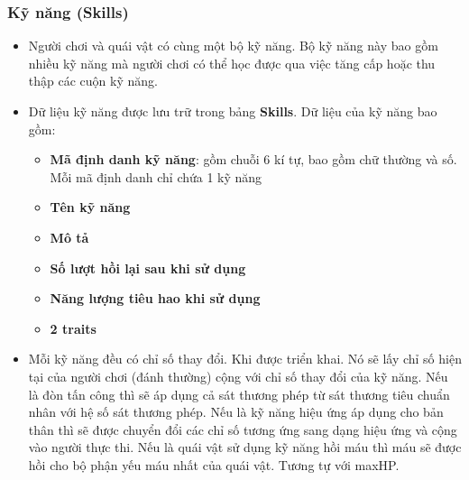 \subsubsection{Kỹ năng (Skills)}
\begin{itemize}
	\item Người chơi và quái vật có cùng một bộ kỹ năng. Bộ kỹ năng này bao gồm nhiều kỹ năng mà người chơi có thể học được qua việc tăng cấp hoặc thu thập các cuộn kỹ năng. 
	\item Dữ liệu kỹ năng được lưu trữ trong bảng \textbf{Skills}. Dữ liệu của kỹ năng bao gồm:
	\begin{itemize}
		\item \textbf{Mã định danh kỹ năng}: gồm chuỗi 6 kí tự, bao gồm chữ thường và số. Mỗi mã định danh chỉ chứa 1 kỹ năng
		\item \textbf{Tên kỹ năng}
		\item \textbf{Mô tả}
		\item \textbf{Số lượt hồi lại sau khi sử dụng}
		\item \textbf{Năng lượng tiêu hao khi sử dụng}
		\item \textbf{2 traits}
	\end{itemize}
	\item Mỗi kỹ năng đều có chỉ số thay đổi. Khi được triển khai. Nó sẽ lấy chỉ số hiện tại của người chơi (đánh thường) cộng với chỉ số thay đổi của kỹ năng. Nếu là đòn tấn công thì sẽ áp dụng cả sát thương phép từ sát thương tiêu chuẩn nhân với hệ số sát thương phép. Nếu là kỹ năng hiệu ứng áp dụng cho bản thân thì sẽ được chuyển đổi các chỉ số tương ứng sang dạng hiệu ứng và cộng vào người thực thi. Nếu là quái vật sử dụng kỹ năng hồi máu thì máu sẽ được hồi cho bộ phận yếu máu nhất của quái vật. Tương tự với maxHP.
\end{itemize}

